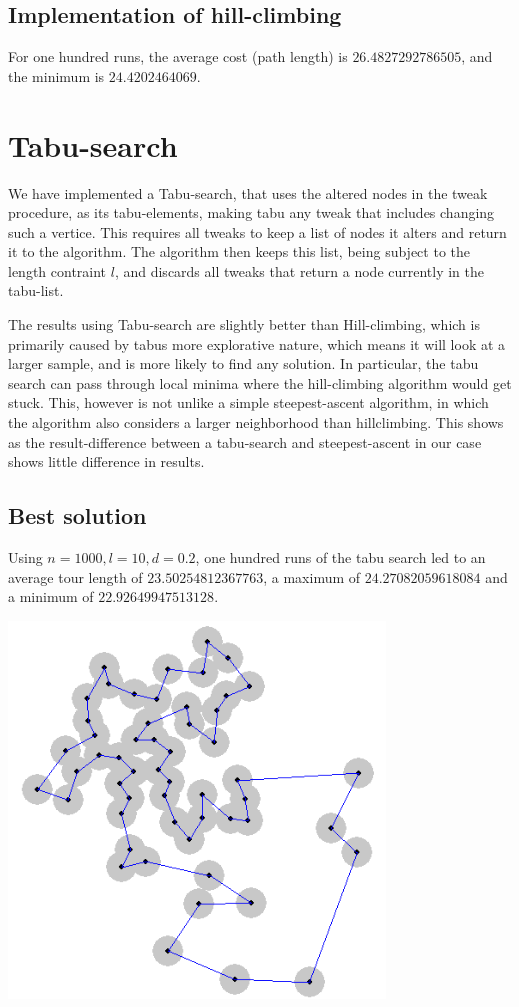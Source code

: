 \documentclass{article}
\begin{document}
\subsection{Implementation of hill-climbing}

For one hundred runs, the average cost (path length) is
$26.4827292786505$, and the minimum is $24.4202464069$.

\section{Tabu-search}
We have implemented a Tabu-search, that uses the altered nodes in the tweak procedure,
as its tabu-elements, making tabu any tweak that includes changing such a vertice.
This requires all tweaks to keep a list of nodes it alters and return it to the algorithm.
The algorithm then keeps this list, being subject to the length contraint $l$, and discards all tweaks that return
a node currently in the tabu-list.

The results using Tabu-search are slightly better than Hill-climbing,
which is primarily caused by tabus more explorative nature, which
means it will look at a larger sample, and is more likely to find any
solution.  In particular, the tabu search can pass through local
minima where the hill-climbing algorithm would get stuck.  This,
however is not unlike a simple steepest-ascent algorithm, in which the
algorithm also considers a larger neighborhood than hillclimbing. This
shows as the result-difference between a tabu-search and
steepest-ascent in our case shows little difference in results.

\subsection{Best solution}

Using $n=1000,l=10,d=0.2$, one hundred runs of the tabu search led to
an average tour length of $23.50254812367763$, a maximum of
$24.27082059618084$ and a minimum of $22.92649947513128$.

\includegraphics[width=100mm]{solution-2316.png}
\end{document}
